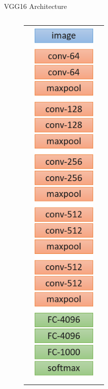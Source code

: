 \documentclass[aspectratio=169]{beamer}
\begin{document}
\begin{frame}{VGG16 Architecture}
\vspace{-0.5cm}
\begin{columns}
	\begin{column}{0.1\textwidth}
		\begin{figure}
			\begin{tabular}{c}
				\includegraphics[width=0.8\textwidth]{img/cnn/vgg16_architecture.png}

\end{tabular}
\end{figure}
\end{column}
\end{columns}
\end{frame}
\end{document}
